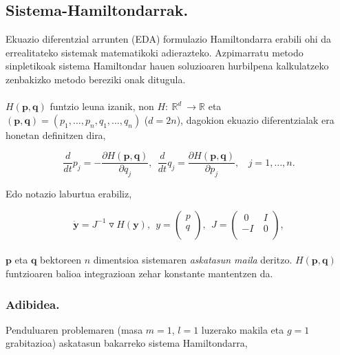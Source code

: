 \subsection{Sistema-Hamiltondarrak.}


Ekuazio diferentzial arrunten (EDA) formulazio Hamiltondarra erabili ohi da errealitateko sistemak matematikoki adierazteko. Azpimarratu metodo sinpletikoak sistema Hamiltondar hauen soluzioaren hurbilpena kalkulatzeko zenbakizko metodo bereziki onak ditugula. 

\paragraph*{} $H(\mathbf{p},\mathbf{q})$ funtzio leuna izanik, non  $H: \ {\mathbb{R}}^{d} \ \longrightarrow {\mathbb{R}}$  eta  $(\mathbf{p},\mathbf{q})=(p_1, \dots , p_n,q_1, \dots , q_n)$ ($d=2n$),  dagokion ekuazio diferentzialak era honetan definitzen dira,

\begin{equation}\label{eq:11}
\frac{d}{dt}{p}_j=-\frac{\partial H(\mathbf{p},\mathbf{q})}{\partial q_j}, \ \ \frac{d}{dt}{q}_j=\frac{\partial H(\mathbf{p},\mathbf{q})}{\partial p_j}, \ \ \ \ j=1,\dots,n.
\end{equation} 

Edo notazio laburtua erabiliz,

\begin{equation}
\dot{\mathbf{y}}=J^{-1}\triangledown H(\mathbf{y}),\ \ 
y=\left(\begin{array}{c}
  p \\
  q \\
  \end{array}\right), \ \
J=\left(\begin{array}{cc}
  \ 0 & \ I \\
   -I & \ 0 \\
\end{array}\right),  
\end{equation}

\paragraph*{}$\mathbf{p}$ eta $\mathbf{q}$ bektoreen $n$ dimentsioa sistemaren \emph{askatasun maila} deritzo. $H(\mathbf{p},\mathbf{q})$ funtzioaren balioa integrazioan zehar konstante mantentzen da.

\subsubsection*{Adibidea.} Penduluaren problemaren (masa $m=1$, $l=1$ luzerako makila eta $g=1$ grabitazioa) askatasun bakarreko sistema Hamiltondarra,

